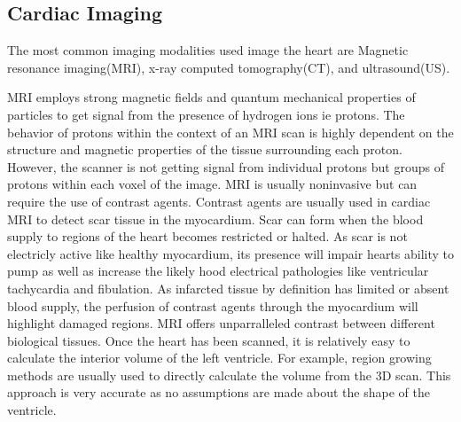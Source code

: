 \documentclass[12pt]{article}
\begin{document}
\subsection{Cardiac Imaging}

The most common imaging modalities used image the heart are Magnetic resonance imaging(MRI), x-ray computed tomography(CT), and ultrasound(US).

MRI employs strong magnetic fields and quantum mechanical properties of particles to get signal from the presence of hydrogen ions ie protons.
The behavior of protons within the context of an MRI scan is highly dependent on the structure and magnetic properties of the tissue surrounding each proton.
However, the scanner is not getting signal from individual protons but groups of protons within each voxel of the image.
MRI is usually noninvasive but can require the use of contrast agents.
Contrast agents are usually used in cardiac MRI to detect scar tissue in the myocardium.
Scar can form when the blood supply to regions of the heart becomes restricted or halted.
As scar is not electricly active like healthy myocardium, its presence will impair hearts ability to pump as well as increase the likely hood electrical pathologies like ventricular tachycardia and fibulation.
As infarcted tissue by definition has limited or absent blood supply, the perfusion of contrast agents through the myocardium will highlight damaged regions.
MRI offers unparralleled contrast between different biological tissues.
Once the heart has been scanned, it is relatively easy to calculate the interior volume of the left ventricle.
For example, region growing methods are usually used  to directly calculate the volume from the 3D scan.
This approach is very accurate as no assumptions are made about the shape of the ventricle.
\end{document}
